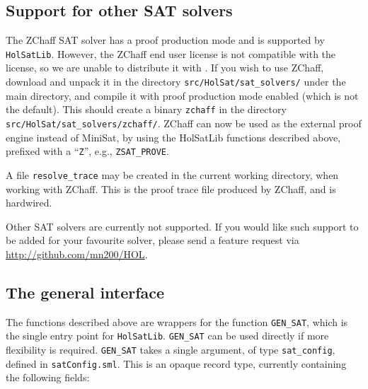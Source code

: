 \subsection{Support for other SAT solvers}\label{subsec:hs-zchaff}

The ZChaff SAT solver has a proof production mode and is supported by {\tt{HolSatLib}}. However, the ZChaff end user license is not compatible with the \HOL{} license, so we are unable to distribute it with \HOL{}. If you wish to use ZChaff, download and unpack it in the directory {\tt src/HolSat/sat\_solvers/} under the main \HOL{} directory, and compile it with proof production mode enabled (which is not the default). This should create a binary {\tt zchaff} in the directory {\tt src/HolSat/sat\_solvers/zchaff/}. ZChaff can now be used as the external proof engine instead of MiniSat, by using the HolSatLib functions described above, prefixed with a ``{\tt Z}'', e.g., {\tt ZSAT\_PROVE}.

A file \texttt{resolve\_trace} may be created in the current working directory, when working with ZChaff. This is the proof trace file produced by ZChaff, and is hardwired.

Other SAT solvers are currently not supported. If you would like such support to be added for your favourite solver, please send a feature request via \url{http://github.com/mn200/HOL}.

\subsection{The general interface}

The functions described above are wrappers for the function \texttt{GEN\_SAT}, which is the single entry point for {\tt{HolSatLib}}. \texttt{GEN\_SAT} can be used directly if more flexibility is required. \texttt{GEN\_SAT} takes a single argument, of type \texttt{sat\_config}, defined in \texttt{satConfig.sml}. This is an opaque record type, currently containing the following fields:

